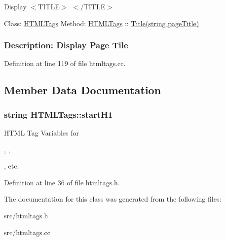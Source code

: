 Display $<$\-T\-I\-T\-L\-E$>$ $<$/\-T\-I\-T\-L\-E$>$ 



 Class\-: \hyperlink{classHTMLTags}{H\-T\-M\-L\-Tags} Method\-: \hyperlink{classHTMLTags}{H\-T\-M\-L\-Tags} \-:\-: \hyperlink{classHTMLTags_a5128d6f1c6be5ac1689047fc9d0d159f}{Title(string page\-Title)} \subsubsection*{Description\-: Display Page Tile}

Definition at line 119 of file htmltags.\-cc.



\subsection{Member Data Documentation}
\hypertarget{classHTMLTags_ae987289d0dab2e3e234048615f930d0f}{
\subsubsection[{start\-H1}]{\setlength{\rightskip}{0pt plus 5cm}string H\-T\-M\-L\-Tags\-::start\-H1\hspace{0.3cm}{\ttfamily [protected]}}}\label{classHTMLTags_ae987289d0dab2e3e234048615f930d0f}


H\-T\-M\-L Tag Variables for 

, , 

, etc. 



Definition at line 36 of file htmltags.\-h.



The documentation for this class was generated from the following files\-:\begin{DoxyCompactItemize}
\item 
src/htmltags.\-h\item 
src/htmltags.\-cc\end{DoxyCompactItemize}
